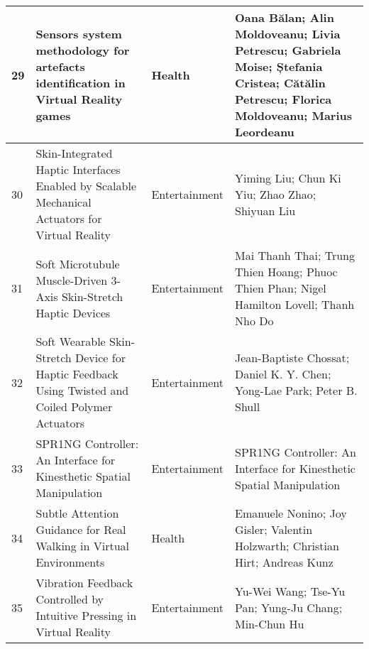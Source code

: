 \begin{landscape}
\begin{table}[]
{\begin{tabular}{|l|l|l|l|}
				29                               & Sensors system methodology for artefacts identification in Virtual Reality games                                                          & Health                                   & Oana Bălan; Alin Moldoveanu; Livia Petrescu; Gabriela Moise; Ștefania Cristea; Cătălin Petrescu; Florica Moldoveanu; Marius Leordeanu                                                                    \\ \hline
				30                               & Skin-Integrated Haptic Interfaces Enabled by Scalable Mechanical Actuators for Virtual Reality                                            & Entertainment                            & Yiming Liu; Chun Ki Yiu; Zhao Zhao; Shiyuan Liu                                                                        \\ \hline
				31                               & Soft Microtubule Muscle-Driven 3-Axis Skin-Stretch Haptic Devices                                                                         & Entertainment                            & Mai Thanh Thai; Trung Thien Hoang; Phuoc Thien Phan; Nigel Hamilton Lovell; Thanh Nho Do                                                                      \\ \hline
				32                               & Soft Wearable Skin-Stretch Device for Haptic Feedback Using Twisted and Coiled Polymer Actuators                                          & Entertainment                            & Jean-Baptiste Chossat; Daniel K. Y. Chen; Yong-Lae Park; Peter B. Shull                                                                      \\ \hline
				33                               & SPR1NG Controller: An Interface for Kinesthetic Spatial Manipulation                                                                      & Entertainment                            & SPR1NG Controller: An Interface for Kinesthetic Spatial Manipulation                                                         \\ \hline
				34                               & Subtle Attention Guidance for Real Walking in Virtual Environments                                                                        & Health                                   & Emanuele Nonino; Joy Gisler; Valentin Holzwarth; Christian Hirt; Andreas Kunz                                                                  \\ \hline
				35                               & Vibration Feedback Controlled by Intuitive Pressing in Virtual Reality                                                                    & Entertainment                            & Yu-Wei Wang; Tse-Yu Pan; Yung-Ju Chang; Min-Chun Hu                                                                      \\ \hline

\end{tabular}}
\end{table}
\end{landscape}
